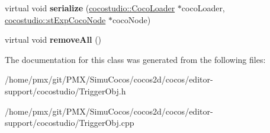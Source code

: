 \begin{DoxyCompactItemize}
\item 
\mbox{\label{classcocostudio_1_1BaseTriggerCondition_a44bb66c3322375212a131bca57541f1e}} 
virtual void {\bfseries serialize} (\hyperlink{classcocostudio_1_1CocoLoader}{cocostudio\+::\+Coco\+Loader} $\ast$coco\+Loader, \hyperlink{structcocostudio_1_1stExpCocoNode}{cocostudio\+::st\+Exp\+Coco\+Node} $\ast$coco\+Node)
\item 
\mbox{\label{classcocostudio_1_1BaseTriggerCondition_ac7c7fd501930d7996ea27fdf0142f78d}} 
virtual void {\bfseries remove\+All} ()
\end{DoxyCompactItemize}


The documentation for this class was generated from the following files\+:\begin{DoxyCompactItemize}
\item 
/home/pmx/git/\+P\+M\+X/\+Simu\+Cocos/cocos2d/cocos/editor-\/support/cocostudio/Trigger\+Obj.\+h\item 
/home/pmx/git/\+P\+M\+X/\+Simu\+Cocos/cocos2d/cocos/editor-\/support/cocostudio/Trigger\+Obj.\+cpp\end{DoxyCompactItemize}

